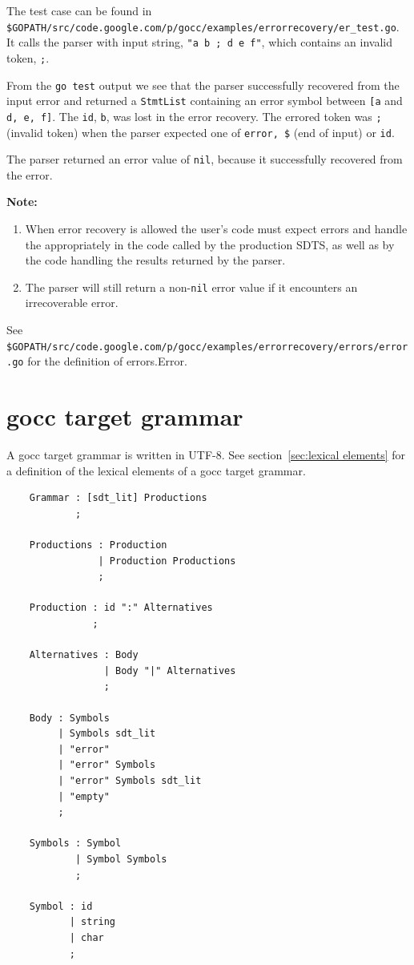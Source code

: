 \documentclass[12pt]{article}
\begin{document}
	The test case can be found in \\
	\verb|$GOPATH/src/code.google.com/p/gocc/examples/errorrecovery/er_test.go|. \\
	It calls the parser with input string, \verb|"a b ; d e f"|, which contains an invalid token, \verb|;|.

	From the \verb|go test| output we see that the parser successfully recovered from the input error and returned a \verb|StmtList| containing an error symbol between \verb|[a| and \verb|d, e, f]|. The \verb|id|, \verb|b|, was lost in the error recovery.  The errored token was \verb|;| (invalid token) when the parser expected one of \verb|error, $| (end of input) or \verb|id|.

	The parser returned an error value of \verb|nil|, because it successfully recovered from the error.

	{\bf Note:} \\
	\begin{enumerate}
		\item When error recovery is allowed the user's code must expect errors and handle the appropriately in the code called by the production SDTS, as well as by the code handling the results returned by the parser.

		\item The parser will still return a non-\verb|nil| error value if it encounters an irrecoverable error.
	\end{enumerate}

	See \verb|$GOPATH/src/code.google.com/p/gocc/examples/errorrecovery/errors/error.go| for the definition of errors.Error.

\appendix
\section{gocc target grammar}\label{sec:gocc bnf}
	A gocc target grammar is written in UTF-8. See section~\ref{sec:lexical elements} for a definition of the lexical elements of a gocc target grammar. 

	\begin{verbatim}
	Grammar : [sdt_lit] Productions 
	        ;

	Productions : Production					
	            | Production Productions			
	            ;

	Production : id ":" Alternatives		
	           ;

	Alternatives : Body					
	             | Body "|" Alternatives	
	             ; 

	Body : Symbols					
	     | Symbols sdt_lit			
	     | "error"
	     | "error" Symbols
	     | "error" Symbols sdt_lit
	     | "empty"
	     ;

	Symbols	: Symbol					
	        | Symbol Symbols			
	        ;

	Symbol : id							
	       | string						
	       | char	
	       ;
	\end{verbatim}
\end{document}
